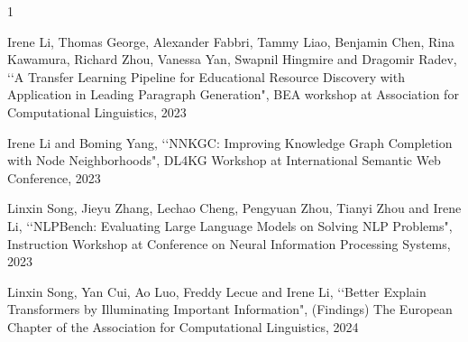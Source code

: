






\begin{査読付}{1}  %

Irene Li, Thomas George, Alexander Fabbri, Tammy Liao, Benjamin Chen, Rina Kawamura, Richard Zhou, Vanessa Yan, Swapnil Hingmire and Dragomir Radev, \lq\lq A Transfer Learning Pipeline for Educational Resource Discovery with Application in Leading Paragraph Generation", BEA workshop at Association for Computational Linguistics, 2023

Irene Li and Boming Yang, \lq\lq NNKGC: Improving Knowledge Graph Completion with Node Neighborhoods", DL4KG Workshop at International Semantic Web Conference, 2023

Linxin Song, Jieyu Zhang, Lechao Cheng, Pengyuan Zhou, Tianyi Zhou and Irene Li, \lq\lq NLPBench: Evaluating Large Language Models on Solving NLP Problems", Instruction Workshop at Conference on Neural Information Processing Systems, 2023


Linxin Song, Yan Cui, Ao Luo, Freddy Lecue and Irene Li, \lq\lq Better Explain Transformers by Illuminating Important Information", (Findings) The European Chapter of the Association for Computational Linguistics, 2024


\end{査読付}  %


